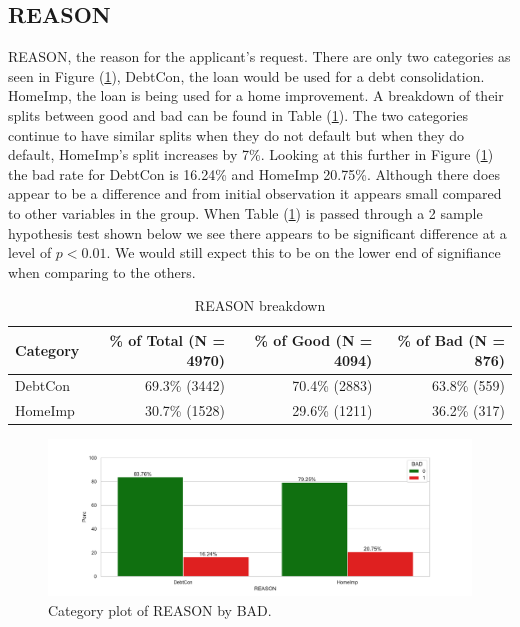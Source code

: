 \subsection*{REASON}

REASON, the reason for the applicant's request. There are only two categories as seen in Figure (\ref{reason_cat}),  DebtCon, the loan would be used for a debt consolidation. HomeImp, the loan is being used for a home improvement. A breakdown of their splits between good and bad can be found in Table (\ref{reason_count_tbl}). The two categories continue to have similar splits when they do not default but when they do default,  HomeImp's split increases by 7\%. Looking at this further in Figure (\ref{reason_cat}) the bad rate for DebtCon is 16.24\% and HomeImp 20.75\%. Although there does appear to be a difference and from initial observation it appears small compared to other variables in the group. When Table (\ref{reason_count_tbl}) is passed through a 2 sample hypothesis test shown below we see there appears to be significant difference at a level of $p < 0.01$. We would still expect this to be on the lower end of signifiance when comparing to the others.

\begin{table}[H]
	\centering
	\renewcommand{\arraystretch}{2}
	\begin{tabular}{lrrr}
		\toprule
		Category & \% of Total (N = 4970) & \% of Good (N = 4094) & \% of Bad (N = 876) \\
		\midrule
		DebtCon &  69.3\% (3442) & 70.4\% (2883) & 63.8\% (559)  \\
		HomeImp & 30.7\% (1528) & 29.6\% (1211) &  36.2\% (317)  \\
		\bottomrule
	\end{tabular}
	\caption{REASON breakdown \label{reason_count_tbl}}
\end{table}

\begin{figure}[H]
	\centering
	\includegraphics[scale=0.40]{figs/reason_cat.pdf}
	\caption{Category plot of REASON by BAD. \label{reason_cat}}
\end{figure}

